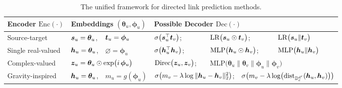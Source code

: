 \begin{table}[h]
\centering
\vspace{-4mm}
\caption{The unified framework for directed link prediction methods.}
\label{app_table_fram}
\begin{tabular}{@{}lllllllll@{}}
\toprule
Encoder $\mathrm{Enc}(\cdot)$ 
 &\multicolumn{2}{l}{Embeddings $({\bm \theta_u}, {\bm \phi_u})$}
 &\multicolumn{6}{l}{Possible Decoder $\mathrm{Dec}(\cdot)$}\\
\midrule
Source-target  & ${\bm{s}}_u = \bm{\theta}_u$,           & ${\bm{t}}_u = \bm{\phi}_u$          & \multicolumn{2}{l}{$\sigma\bigl({\bm{s}}_u^{\top}{\bm{t}}_v\bigr)$;} & \multicolumn{2}{l}{$\mathrm{LR}\bigl({\bm{s}}_u \odot {\bm{t}}_v\bigr)$;} & \multicolumn{2}{l}{\quad$\mathrm{LR}\bigl({\bm{s}}_u \|{\bm{t}}_v\bigr)$} \\[3.0pt]

Single real-valued  & ${\bm{h}}_u = \bm{\theta}_u$,  & $\varnothing = \bm{\phi}_u$          & \multicolumn{2}{l}{$\sigma\bigl({\bm{h}}_u^{\top}{\bm{h}}_v\bigr)$;} & \multicolumn{2}{l}{$\mathrm{MLP}\bigl({\bm{h}}_u \odot {\bm{h}}_v\bigr)$;} & \multicolumn{2}{l}{\quad$\mathrm{MLP}\bigl({\bm{h}}_u \|{\bm{h}}_v\bigr)$} \\[3.0pt]

Complex-valued  & \multicolumn{2}{l}{${\bm{z}}_u = \bm{\theta}_u\odot\exp\bigl(i\,\bm{\phi}_u\bigr)$}  & \multicolumn{2}{l}{$\mathrm{Direc}\bigl({\bm{z}}_u,{\bm{z}}_v\bigr)$;} & \multicolumn{4}{l}{$\mathrm{MLP}\bigl(\bm{\theta}_u \|\bm{\theta}_v \|\bm{\phi}_u \|\bm{\phi}_v\bigr)$} \\[3.0pt]

Gravity-inspired  & ${\bm{h}}_u = \bm{\theta}_u$,  &$m_u = g(\bm{\phi}_u)$         & \multicolumn{3}{l}{$\sigma\bigl(m_v - \lambda\log\|{\bm{h}}_u-{\bm{h}}_v\|_2^2\bigr)$;}              & \multicolumn{3}{l}{$\sigma\bigl(m_v - \lambda\log \bigl(\mathrm{dist}_{\mathbb{D}_c^{d'}}({\bm{h}}_u,{\bm{h}}_v)\bigr)\bigr)$}  \\
\bottomrule
\end{tabular}
\end{table}

